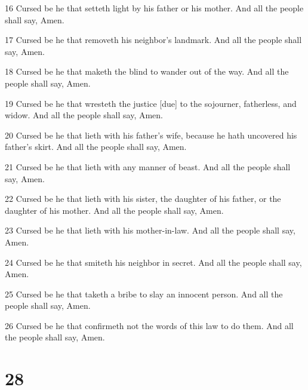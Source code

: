 \par 16 Cursed be he that setteth light by his father or his mother. And all the people shall say, Amen.
\par 17 Cursed be he that removeth his neighbor's landmark. And all the people shall say, Amen.
\par 18 Cursed be he that maketh the blind to wander out of the way. And all the people shall say, Amen.
\par 19 Cursed be he that wresteth the justice [due] to the sojourner, fatherless, and widow. And all the people shall say, Amen.
\par 20 Cursed be he that lieth with his father's wife, because he hath uncovered his father's skirt. And all the people shall say, Amen.
\par 21 Cursed be he that lieth with any manner of beast. And all the people shall say, Amen.
\par 22 Cursed be he that lieth with his sister, the daughter of his father, or the daughter of his mother. And all the people shall say, Amen.
\par 23 Cursed be he that lieth with his mother-in-law. And all the people shall say, Amen.
\par 24 Cursed be he that smiteth his neighbor in secret. And all the people shall say, Amen.
\par 25 Cursed be he that taketh a bribe to slay an innocent person. And all the people shall say, Amen.
\par 26 Cursed be he that confirmeth not the words of this law to do them. And all the people shall say, Amen.

\chapter{28}

